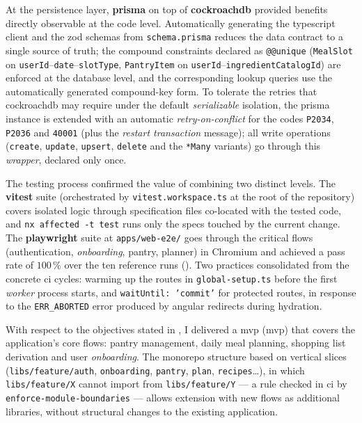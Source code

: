 At the persistence layer, \textbf{\gls{prisma}} on top of \textbf{\gls{cockroachdb}} provided benefits directly observable at the code level.
Automatically generating the \gls{typescript} client and the \gls{zod} schemas from \texttt{schema.prisma} reduces the data contract to a single source of truth; the compound constraints declared as \texttt{@@unique} (\texttt{MealSlot} on \texttt{userId}--\texttt{date}--\texttt{slotType}, \texttt{PantryItem} on \texttt{userId}--\texttt{ingredientCatalogId}) are enforced at the database level, and the corresponding lookup queries use the automatically generated compound-key form.
To tolerate the retries that \gls{cockroachdb} may require under the default \textit{serializable} isolation, the \gls{prisma} instance is extended with an automatic \textit{retry-on-conflict} for the codes \texttt{P2034}, \texttt{P2036} and \texttt{40001} (plus the \textit{restart transaction} message); all write operations (\texttt{create}, \texttt{update}, \texttt{upsert}, \texttt{delete} and the \texttt{*Many} variants) go through this \textit{wrapper}, declared only once.

The testing process confirmed the value of combining two distinct levels.
The \textbf{\gls{vitest}} suite (orchestrated by \texttt{vitest.workspace.ts} at the root of the repository) covers isolated logic through specification files co-located with the tested code, and \texttt{nx affected -t test} runs only the specs touched by the current change.
The \textbf{\gls{playwright}} suite at \texttt{apps/web-e2e/} goes through the critical flows (authentication, \textit{onboarding}, pantry, planner) in Chromium and achieved a pass rate of \(100\,\%\) over the ten reference runs ().
Two practices consolidated from the concrete \acrshort{ci} cycles: warming up the routes in \texttt{global-setup.ts} before the first \textit{worker} process starts, and \texttt{waitUntil: 'commit'} for protected routes, in response to the \texttt{ERR\_ABORTED} error produced by \gls{angular} redirects during hydration.

With respect to the objectives stated in , I delivered a \acrlong{mvp} (\acrshort{mvp}) that covers the application's core flows: pantry management, daily meal planning, shopping list derivation and user \textit{onboarding}.
The \gls{monorepo} structure based on vertical slices (\texttt{libs/feature/auth}, \texttt{onboarding}, \texttt{pantry}, \texttt{plan}, \texttt{recipes}\ldots), in which \texttt{libs/feature/X} cannot import from \texttt{libs/feature/Y} --- a rule checked in \acrshort{ci} by \texttt{enforce-module-boundaries} --- allows extension with new flows as additional libraries, without structural changes to the existing application.


